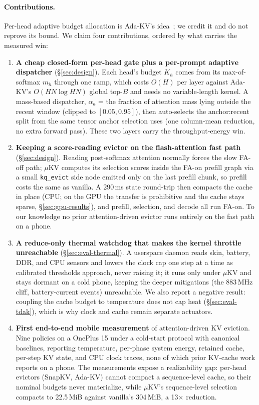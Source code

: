 \documentclass[sigconf, anonymous=false, screen=true]{acmart}
\begin{document}
\paragraph{Contributions.} Per-head adaptive budget allocation is Ada-KV's idea~\cite{feng2025adakv}; we credit it and do not reprove its bound. We claim four contributions, ordered by what carries the measured win:

\begin{enumerate}[label=(\roman*),leftmargin=*,itemsep=2pt]
\item \textbf{A cheap closed-form per-head gate plus a per-prompt adaptive dispatcher} (\S\ref{sec:design}). Each head's budget $K_h$ comes from its max-of-softmax $m_h$ through one ramp, which costs $O(H)$ per layer against Ada-KV's $O(HN\log HN)$ global top-$B$ and needs no variable-length kernel. A mass-based dispatcher, $\alpha_a$ = the fraction of attention mass lying outside the recent window (clipped to $[0.05, 0.95]$), then auto-selects the anchor:recent split from the same tensor anchor selection uses (one column-mean reduction, no extra forward pass). These two layers carry the throughput-energy win.

\item \textbf{Keeping a score-reading evictor on the flash-attention fast path} (\S\ref{sec:design}). Reading post-softmax attention normally forces the slow FA-off path; $\mu$KV computes its selection scores inside the FA-on prefill graph via a small \texttt{kq\_evict} side node emitted only on the last prefill chunk, so prefill costs the same as vanilla. A 290\,ms state round-trip then compacts the cache in place (CPU; on the GPU the transfer is prohibitive and the cache stays sparse, \S\ref{sec:gpu-results}), and prefill, selection, and decode all run FA-on. To our knowledge no prior attention-driven evictor runs entirely on the fast path on a phone.

\item \textbf{A reduce-only thermal watchdog that makes the kernel throttle unreachable} (\S\ref{sec:eval-thermal}). A userspace daemon reads skin, battery, DDR, and CPU sensors and lowers the clock cap one step at a time as calibrated thresholds approach, never raising it; it runs only under $\mu$KV and stays dormant on a cold phone, keeping the deeper mitigations (the 883\,MHz cliff, battery-current events) unreachable. We also report a negative result: coupling the cache budget to temperature does not cap heat (\S\ref{sec:eval-tdak}), which is why clock and cache remain separate actuators.

\item \textbf{First end-to-end mobile measurement} of attention-driven KV eviction. Nine policies on a OnePlus 15 under a cold-start protocol with canonical baselines, reporting temperature, per-phase system energy, retained cache, per-step KV state, and CPU clock traces, none of which prior KV-cache work reports on a phone. The measurements expose a realizability gap: per-head evictors (SnapKV, Ada-KV) cannot compact a sequence-level cache, so their nominal budgets never materialize, while $\mu$KV's sequence-level selection compacts to 22.5\,MiB against vanilla's 304\,MiB, a 13$\times$ reduction.
\end{enumerate}
\end{document}
